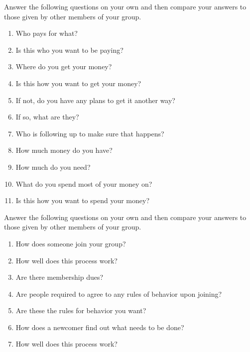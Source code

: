 
Answer the following questions on your own
and then compare your answers to those given by other members of your group.

\begin{enumerate}

\item
  Who pays for what?

\item
  Is this who you want to be paying?

\item
  Where do you get your money?

\item
  Is this how you want to get your money?

\item
  If not, do you have any plans to get it another way?

\item
  If so, what are they?

\item
  Who is following up to make sure that happens?

\item
  How much money do you have?

\item
  How much do you need?

\item
  What do you spend most of your money on?

\item
  Is this how you want to spend your money?

\end{enumerate}


Answer the following questions on your own
and then compare your answers to those given by other members of your group.

\begin{enumerate}

\item
  How does someone join your group?

\item
  How well does this process work?

\item
  Are there membership dues?

\item
  Are people required to agree to any rules of behavior upon joining?

\item
  Are these the rules for behavior you want?

\item
  How does a newcomer find out what needs to be done?

\item
  How well does this process work?
  
\end{enumerate}

